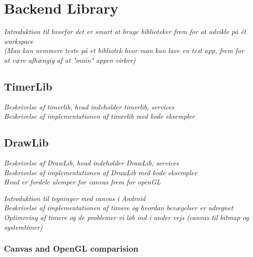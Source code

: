 \section{Backend Library}
\label{sec:backend}
\textit{Introduktion til hvorfor det er smart at bruge biblioteker frem for at udvikle på ét workspace\\
(Man kan nemmere teste på et bibliotek hvor man kan lave en test app, frem for at være afhængig af at "main" appen virker)}

\subsection{TimerLib}
\textit{Beskrivelse af timerlib, hvad indeholder timerlib, services\\
Beskrivelse af implementationen af timerlib med kode eksempler}

\subsection{DrawLib}
\textit{Beskrivelse af DrawLib, hvad indeholder DrawLib, services\\
Beskrivelse af implementationen af DrawLib med kode eksempler\\
Hvad er fordele ulemper for canvas frem for openGL}


\textit{Introduktion til tegninger med canvas i Android\\
Beskrivelse af implementationen af timere og hvordan bevægelser er udregnet\\
Optimering af timere og de problemer vi løb ind i under vejs (canvas til bitmap og systemtimer)}

\subsubsection{Canvas and OpenGL comparision}
\label{subsection:compare}